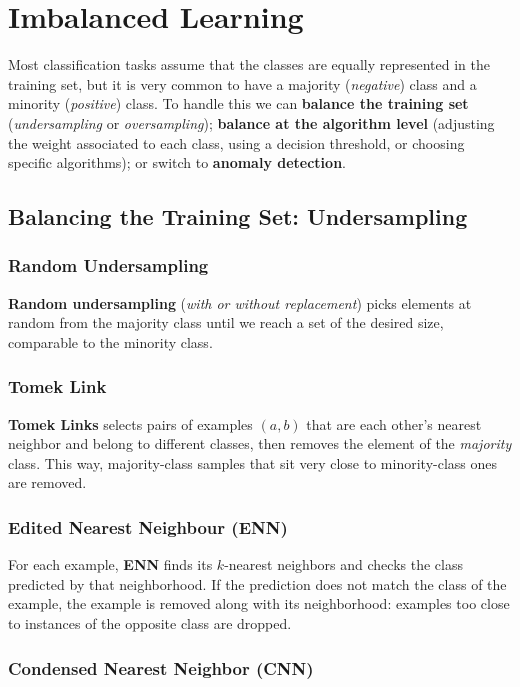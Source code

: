 \section{Imbalanced Learning}
Most classification tasks assume that the classes are equally represented in the training set, but it is very common to have a majority (\textit{negative}) class and a minority (\textit{positive}) class. To handle this we can \textbf{balance the training set} (\textit{undersampling} or \textit{oversampling}); \textbf{balance at the algorithm level} (adjusting the weight associated to each class, using a decision threshold, or choosing specific algorithms); or switch to \textbf{anomaly detection}.

\subsection{Balancing the Training Set: Undersampling}
\subsubsection{Random Undersampling}
\textbf{Random undersampling} (\textit{with or without replacement}) picks elements at random from the majority class until we reach a set of the desired size, comparable to the minority class.

\subsubsection{Tomek Link}
\textbf{Tomek Links} selects pairs of examples $(a,b)$ that are each other's nearest neighbor and belong to different classes, then removes the element of the \textit{majority} class. This way, majority-class samples that sit very close to minority-class ones are removed.

\subsubsection{Edited Nearest Neighbour (ENN)}
For each example, \textbf{ENN} finds its $k$-nearest neighbors and checks the class predicted by that neighborhood. If the prediction does not match the class of the example, the example is removed along with its neighborhood: examples too close to instances of the opposite class are dropped.

\subsubsection{Condensed Nearest Neighbor (CNN)}

